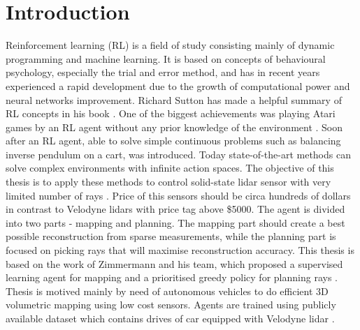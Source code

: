 \section{Introduction}

Reinforcement learning (RL) is a field of study consisting mainly of dynamic programming and machine learning. It is based on concepts of behavioural psychology, especially the trial and error method, and has in recent years experienced a rapid development due to the growth of computational power and neural networks improvement. Richard Sutton has made a helpful summary of RL concepts in his book \cite{sutton2012}. One of the biggest achievements was playing Atari games by an RL agent without any prior knowledge of the environment \cite{mnih2015}. Soon after an RL agent, able to solve simple continuous problems such as balancing inverse pendulum on a cart, was introduced. Today state-of-the-art methods can solve complex environments with infinite action spaces. The objective of this thesis is to apply these methods to control solid-state lidar sensor with very limited number of rays \cite{quanergy2016}. Price of this sensors should be circa hundreds of dollars in contrast to Velodyne lidars with price tag above \$5000. The agent is divided into two parts - mapping and planning. The mapping part should create a best possible reconstruction from sparse measurements, while the planning part is focused on picking rays that will maximise reconstruction accuracy. This thesis is based on the work of Zimmermann and his team, which proposed a supervised learning agent for mapping and a prioritised greedy policy for planning rays \cite{zimmermann2017}. Thesis is motived mainly by need of autonomous vehicles to do efficient 3D volumetric mapping using low cost sensors. Agents are trained using publicly available dataset which contains drives of car equipped with Velodyne lidar \cite{geiger2013}. 